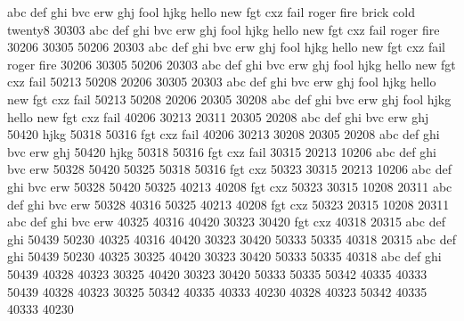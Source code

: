 abc	def	ghi	bvc	erw	ghj	fool	hjkg	hello	new	fgt	cxz	fail	roger	fire	brick	cold	twenty8	30303																													
abc	def	ghi	bvc	erw	ghj	fool	hjkg	hello	new	fgt	cxz	fail	roger	fire	30206	30305	50206	20303																													
abc	def	ghi	bvc	erw	ghj	fool	hjkg	hello	new	fgt	cxz	fail	roger	fire	30206	30305	50206	20303																													
abc	def	ghi	bvc	erw	ghj	fool	hjkg	hello	new	fgt	cxz	fail	50213	50208	20206	30305		20303																													
abc	def	ghi	bvc	erw	ghj	fool	hjkg	hello	new	fgt	cxz	fail	50213	50208	20206	20305	30208																														
abc	def	ghi	bvc	erw	ghj	fool	hjkg	hello	new	fgt	cxz	fail	40206	30213	20311	20305	20208																														
abc	def	ghi	bvc	erw	ghj	50420	hjkg	50318	50316	fgt	cxz	fail	40206	30213	30208	20305	20208																														
abc	def	ghi	bvc	erw	ghj	50420	hjkg	50318	50316	fgt	cxz	fail	30315	20213			10206																														
abc	def	ghi	bvc	erw	50328	50420	50325	50318	50316	fgt	cxz	50323	30315	20213			10206																														
abc	def	ghi	bvc	erw	50328	50420	50325	40213	40208	fgt	cxz	50323	30315	10208	20311																																
abc	def	ghi	bvc	erw	50328	40316	50325	40213	40208	fgt	cxz	50323	20315	10208	20311																																
abc	def	ghi	bvc	erw	40325	40316	40420	30323	30420	fgt	cxz	40318	20315																																		
abc	def	ghi	50439	50230	40325	40316	40420	30323	30420	50333	50335	40318	20315																																		
abc	def	ghi	50439	50230	40325	30325	40420	30323	30420	50333	50335	40318																																			
abc	def	ghi	50439	40328	40323	30325	40420	30323	30420	50333	50335																																				
50342	40335	40333	50439	40328	40323	30325																																									
50342	40335	40333	40230	40328	40323																																										
50342	40335	40333	40230																																												

